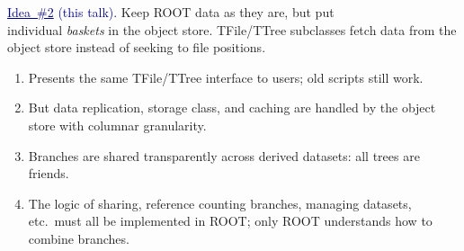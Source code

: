 \documentclass[aspectratio=169]{beamer}
\begin{document}
\begin{frame}{}
\vspace{1 cm}
\begin{center}
\Large \textcolor{darkblue}{\underline{Idea~\#2} (this talk).} Keep ROOT data as they are, but put \\ individual {\it baskets} in the object store. TFile/TTree subclasses fetch data from the object store instead of seeking to file positions.
\end{center}

\begin{enumerate}
\item<2-> Presents the same TFile/TTree interface to users; old scripts still work.
\item<3-> But data replication, storage class, and caching are handled by the object store with columnar granularity.
\item<4-> Branches are shared transparently across derived datasets: all trees are friends.
\item<5-> The logic of sharing, reference counting branches, managing datasets, etc.\ must all be implemented in ROOT; only ROOT understands how to combine branches.
\end{enumerate}

\begin{center}
\end{center}
\end{frame}
\end{document}
